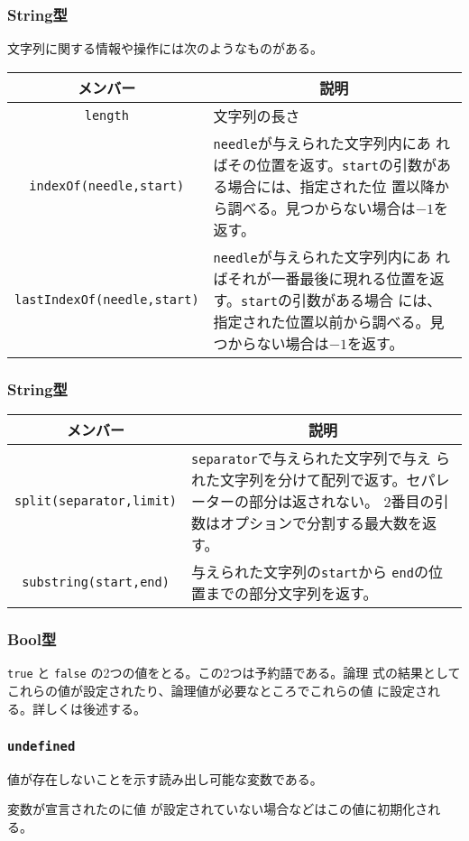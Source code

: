 \begin{frame}[containsverbatim]
 \frametitle{String型}
文字列に関する情報や操作には次のようなものがある。
\begin{center}
 \begin{tabular}{|c|m{}|}\hline
 メンバー&\multicolumn{1}{c|}{説明} \\\hline
  \Verb+length+ &文字列の長さ\\ \hline
\Verb+indexOf(needle,start)+& \Verb+needle+が与えられた文字列内にあ
      ればその位置を返す。\Verb+start+の引数がある場合には、指定された位
      置以降から調べる。見つからない場合は$-1$を返す。\\\hline
\Verb+lastIndexOf(needle,start)+& \Verb+needle+が与えられた文字列内にあ
      ればそれが一番最後に現れる位置を返す。\Verb+start+の引数がある場合
      には、指定された位置以前から調べる。見つからない場合は$-1$を返す。\\\hline
\end{tabular}
\end{center}
\end{frame}
\begin{frame}[containsverbatim]
 \frametitle{String型}
\begin{center}
 \begin{tabular}{|c|m{}|}\hline
 メンバー&\multicolumn{1}{c|}{説明} \\\hline
  \Verb+split(separator,limit)+&\Verb+separator+で与えられた文字列で与え
      られた文字列を分けて配列で返す。セパレーターの部分は返されない。
      2番目の引数はオプションで分割する最大数を返す。\\ \hline
  \Verb+substring(start,end)+&与えられた文字列の\Verb+start+から
      \Verb+end+の位置までの部分文字列を返す。\\ \hline
\end{tabular}
\end{center}
\end{frame}
\begin{frame}[containsverbatim]
 \frametitle{Bool型}
\Verb+true+ と \Verb+false+ の2つの値をとる。この2つは予約語である。論理
式の結果としてこれらの値が設定されたり、論理値が必要なところでこれらの値
に設定される。詳しくは後述する。
\end{frame}
\begin{frame}[containsverbatim]
 \frametitle{\texttt{undefined}}
値が存在しないことを示す読み出し可能な変数である。

変数が宣言されたのに値
が設定されていない場合などはこの値に初期化される。
\end{frame}
